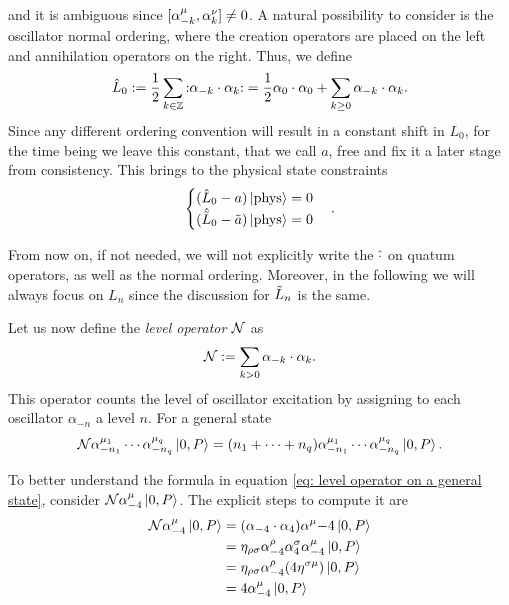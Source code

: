 and it is ambiguous since $[\alpha^\mu_{-k},\alpha^\nu_k] \neq 0$. A natural possibility to consider is the oscillator normal ordering, where the creation operators are placed on the left and annihilation operators on the right. Thus, we define
\begin{equation}
\label{eq: definition of normal ordered L0}
    \hat{L}_0 := \frac{1}{2}\sum_{k\in\mathbb{Z}}{:}\alpha_{-k}\cdot\alpha_k{:} = \frac{1}{2}\alpha_0\cdot\alpha_0 + \sum_{k\ge0}\alpha_{-k}\cdot\alpha_k.
\end{equation}
Since any different ordering convention will result in a constant shift in $L_0$, for the time being we leave this constant, that we call $a$, free and fix it a later stage from consistency. This brings to the physical state constraints
\begin{equation}
\label{eq: physical states constraints}
    \begin{cases}
        (\hat{L}_0 - a)\ket{\mathrm{phys}} = 0 \\
        (\hat{\tilde{L}}_0 - \tilde{a})\ket{\mathrm{phys}} = 0
    \end{cases}.
\end{equation}
\begin{notz}
    From now on, if not needed, we will not explicitly write the $\hat{\cdot}$ on quatum operators, as well as the normal ordering. Moreover, in the following we will always focus on $L_n$ since the discussion for $\tilde{L}_n$ is the same.
\end{notz}
Let us now define the \emph{level operator} $\mathcal{N}$ as
\begin{equation}
    \mathcal{N} := \sum_{k > 0}\alpha_{-k}\cdot\alpha_k.
\end{equation}
This operator counts the level of oscillator excitation by assigning to each oscillator $\alpha_{-n}$ a level $n$. For a general state
\begin{equation}
\label{eq: level operator on a general state}
    \mathcal{N}\alpha^{\mu_1}_{-n_1}\cdots\alpha^{\mu_q}_{-n_q}\ket{0,P} = (n_1 + \cdots + n_q)\alpha^{\mu_1}_{-n_1}\cdots\alpha^{\mu_q}_{-n_q}\ket{0,P}.
\end{equation}
\begin{ex} 
    To better understand the formula in equation \eqref{eq: level operator on a general state}, consider $\mathcal{N}\alpha^\mu_{-4}\ket{0,P}$. The explicit steps to compute it are 
    \begin{equation}
        \begin{split}
            \mathcal{N}\alpha^\mu_{-4}\ket{0,P} &= (\alpha_{-4}\cdot\alpha_4)\alpha^\mu{-4}\ket{0,P} \\
            &= \eta_{\rho\sigma}\alpha^\rho_{-4}\alpha^\sigma_4\alpha^\mu_{-4}\ket{0,P} \\
            &= \eta_{\rho\sigma}\alpha^\rho_{-4}(4\eta^{\sigma\mu})\ket{0,P} \\
            &= 4\alpha^\mu_{-4}\ket{0,P}
        \end{split}
    \end{equation}
\end{ex}

